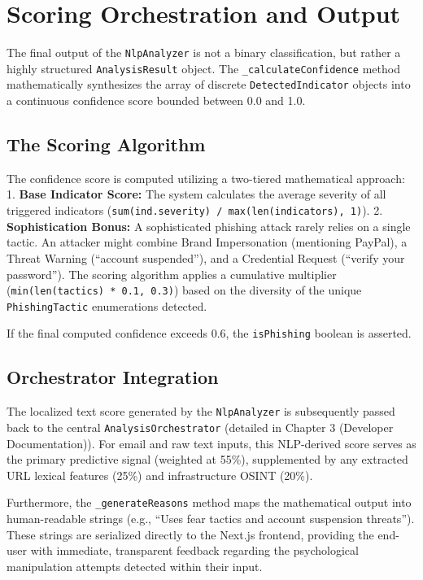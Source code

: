 \section{Scoring Orchestration and
Output}\label{scoring-orchestration-and-output}

The final output of the \texttt{NlpAnalyzer} is not a binary
classification, but rather a highly structured \texttt{AnalysisResult}
object. The \texttt{\_calculateConfidence} method mathematically
synthesizes the array of discrete \texttt{DetectedIndicator} objects
into a continuous confidence score bounded between 0.0 and 1.0.

\subsection{The Scoring Algorithm}\label{the-scoring-algorithm}

The confidence score is computed utilizing a two-tiered mathematical
approach: 1. \textbf{Base Indicator Score:} The system calculates the
average severity of all triggered indicators
(\texttt{sum(ind.severity)\ /\ max(len(indicators),\ 1)}). 2.
\textbf{Sophistication Bonus:} A sophisticated phishing attack rarely
relies on a single tactic. An attacker might combine Brand Impersonation
(mentioning PayPal), a Threat Warning (``account suspended''), and a
Credential Request (``verify your password''). The scoring algorithm
applies a cumulative multiplier
(\texttt{min(len(tactics)\ *\ 0.1,\ 0.3)}) based on the diversity of the
unique \texttt{PhishingTactic} enumerations detected.

If the final computed confidence exceeds 0.6, the \texttt{isPhishing}
boolean is asserted.

\subsection{Orchestrator
Integration}\label{orchestrator-integration}

The localized text score generated by the \texttt{NlpAnalyzer} is
subsequently passed back to the central \texttt{AnalysisOrchestrator}
(detailed in Chapter 3 (Developer Documentation)). For email and raw text inputs, this NLP-derived
score serves as the primary predictive signal (weighted at 55\%),
supplemented by any extracted URL lexical features (25\%) and
infrastructure OSINT (20\%).

Furthermore, the \texttt{\_generateReasons} method maps the mathematical
output into human-readable strings (e.g., ``Uses fear tactics and
account suspension threats''). These strings are serialized directly to
the Next.js frontend, providing the end-user with immediate, transparent
feedback regarding the psychological manipulation attempts detected
within their input.

